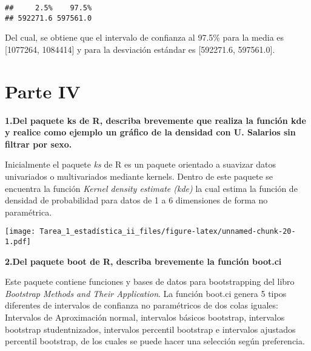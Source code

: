 \documentclass[
]{article}
\newenvironment{Shaded}{\begin{snugshade}}{\end{snugshade}}
\newcommand{\AttributeTok}[1]{\textcolor[rgb]{0.13,0.29,0.53}{#1}}
\newcommand{\ControlFlowTok}[1]{\textcolor[rgb]{0.13,0.29,0.53}{\textbf{#1}}}
\newcommand{\DecValTok}[1]{\textcolor[rgb]{0.00,0.00,0.81}{#1}}
\newcommand{\FunctionTok}[1]{\textcolor[rgb]{0.13,0.29,0.53}{\textbf{#1}}}
\newcommand{\NormalTok}[1]{#1}
\newcommand{\OtherTok}[1]{\textcolor[rgb]{0.56,0.35,0.01}{#1}}
\newcommand{\SpecialCharTok}[1]{\textcolor[rgb]{0.81,0.36,0.00}{\textbf{#1}}}
\newcommand{\StringTok}[1]{\textcolor[rgb]{0.31,0.60,0.02}{#1}}
\begin{document}
\begin{verbatim}
##     2.5%    97.5% 
## 592271.6 597561.0
\end{verbatim}

Del cual, se obtiene que el intervalo de confianza al 97.5\% para la
media es {[}1077264, 1084414{]} y para la desviación estándar es
{[}592271.6, 597561.0{]}.

\hypertarget{parte-iv}{%
\section{Parte IV}\label{parte-iv}}

\textbf{1.Del paquete ks de R, describa brevemente que realiza la
función kde y realice como ejemplo un gráfico de la densidad con U.
Salarios sin filtrar por sexo.}

Inicialmente el paquete \emph{ks} de R es un paquete orientado a
suavizar datos univariados o multivariados mediante kernels. Dentro de
este paquete se encuentra la función \emph{Kernel density estimate
(kde)} la cual estima la función de densidad de probabilidad para datos
de 1 a 6 dimensiones de forma no paramétrica.

\begin{Shaded}
\end{Shaded}

\texttt{[image: Tarea\_1\_estadística\_ii\_files/figure-latex/unnamed-chunk-20-1.pdf]}

\textbf{2.Del paquete boot de R, describa brevemente la función boot.ci}

Este paquete contiene funciones y bases de datos para bootstrapping del
libro \emph{Bootstrap Methods and Their Application}. La función boot.ci
genera 5 tipos diferentes de intervalos de confianza no paramétricos de
dos colas iguales: Intervalos de Aproximación normal, intervalos básicos
bootstrap, intervalos bootstrap studentnizados, intervalos percentil
bootstrap e intervalos ajustados percentil bootstrap, de los cuales se
puede hacer una selección según preferencia.

\begin{Shaded}
\end{Shaded}
\end{document}
